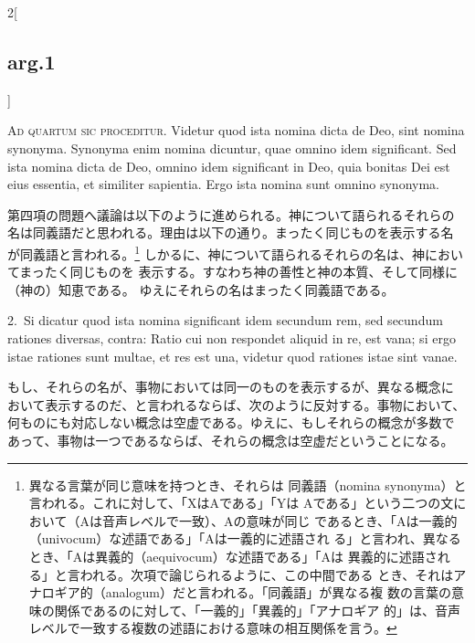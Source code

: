 \documentclass[paper=a4paper,fontsize=10pt,jafontsize=9pt,titlepage]{jlreq}
\begin{document}
\begin{paracol}{2}[\subsection{arg.1}]

{\scshape Ad quartum sic proceditur}. Videtur quod
ista nomina dicta de Deo, sint nomina synonyma. Synonyma enim nomina
dicuntur, quae omnino idem significant. Sed ista nomina dicta de Deo,
omnino idem significant in Deo, quia bonitas Dei est eius essentia, et
similiter sapientia. Ergo ista nomina sunt omnino synonyma.

\switchcolumn

第四項の問題へ議論は以下のように進められる。神について語られるそれらの
名は同義語だと思われる。理由は以下の通り。まったく同じものを表示する名
が同義語と言われる。\footnote{異なる言葉が同じ意味を持つとき、それらは
同義語（nomina synonyma）と言われる。これに対して、「XはAである」「Yは
Aである」という二つの文において（Aは音声レベルで一致）、Aの意味が同じ
であるとき、「Aは一義的（univocum）な述語である」「Aは一義的に述語され
る」と言われ、異なるとき、「Aは異義的（aequivocum）な述語である」「Aは
異義的に述語される」と言われる。次項で論じられるように、この中間である
とき、それはアナロギア的（analogum）だと言われる。「同義語」が異なる複
数の言葉の意味の関係であるのに対して、「一義的」「異義的」「アナロギア
的」は、音声レベルで一致する複数の述語における意味の相互関係を言う。}
しかるに、神について語られるそれらの名は、神においてまったく同じものを
表示する。すなわち神の善性と神の本質、そして同様に（神の）知恵である。
ゆえにそれらの名はまったく同義語である。

\switchcolumn*

2.~Si dicatur quod ista nomina significant idem secundum rem, sed
secundum rationes diversas, contra: Ratio cui non respondet aliquid in
re, est vana; si ergo istae rationes sunt multae, et res est una,
videtur quod rationes istae sint vanae.

\switchcolumn

もし、それらの名が、事物においては同一のものを表示するが、異なる概念に
おいて表示するのだ、と言われるならば、次のように反対する。事物において、
何ものにも対応しない概念は空虚である。ゆえに、もしそれらの概念が多数で
あって、事物は一つであるならば、それらの概念は空虚だということになる。



\end{paracol}
\end{document}
